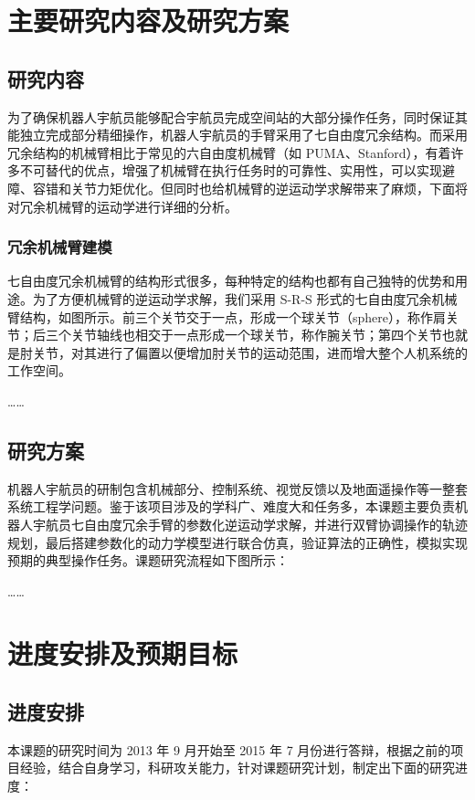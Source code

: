 \section{主要研究内容及研究方案}
\subsection{研究内容}
为了确保机器人宇航员能够配合宇航员完成空间站的大部分操作任务，同时保证其能独立完成部分精细操作，机器人宇航员的手臂采用了七自由度冗余结构。而采用冗余结构的机械臂相比于常见的六自由度机械臂（如 PUMA、Stanford），有着许多不可替代的优点，增强了机械臂在执行任务时的可靠性、实用性，可以实现避障、容错和关节力矩优化。但同时也给机械臂的逆运动学求解带来了麻烦，下面将对冗余机械臂的运动学进行详细的分析。

\subsubsection{冗余机械臂建模}
七自由度冗余机械臂的结构形式很多，每种特定的结构也都有自己独特的优势和用途。为了方便机械臂的逆运动学求解，我们采用 S-R-S 形式的七自由度冗余机械臂结构，如图所示。前三个关节交于一点，形成一个球关节（sphere），称作肩关节；后三个关节轴线也相交于一点形成一个球关节，称作腕关节；第四个关节也就是肘关节，对其进行了偏置以便增加肘关节的运动范围，进而增大整个人机系统的工作空间。

……

\subsection{研究方案}
机器人宇航员的研制包含机械部分、控制系统、视觉反馈以及地面遥操作等一整套系统工程学问题。鉴于该项目涉及的学科广、难度大和任务多，本课题主要负责机器人宇航员七自由度冗余手臂的参数化逆运动学求解，并进行双臂协调操作的轨迹规划，最后搭建参数化的动力学模型进行联合仿真，验证算法的正确性，模拟实现预期的典型操作任务。课题研究流程如下图所示：

……

\section{进度安排及预期目标}
\subsection{进度安排}
本课题的研究时间为 2013 年 9 月开始至 2015 年 7 月份进行答辩，根据之前的项目经验，结合自身学习，科研攻关能力，针对课题研究计划，制定出下面的研究进度：

